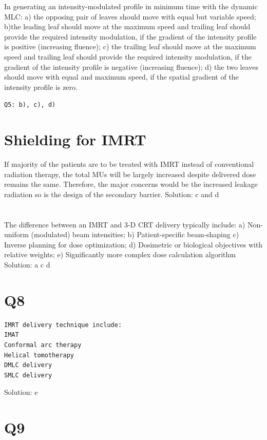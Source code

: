 \documentclass[]{book}
\theoremstyle{definition}
\theoremstyle{definition}
\theoremstyle{definition}
\theoremstyle{remark}
\begin{document}
In generating an intensity-modulated profile in minimum time with the
dynamic MLC: a) the opposing pair of leaves should move with equal but
variable speed; b)the leading leaf should move at the maximum speed and
trailing leaf should provide the required intensity modulation, if the
gradient of the intensity profile is positive (increasing fluence); c)
the trailing leaf should move at the maximum speed and trailing leaf
should provide the required intensity modulation, if the gradient of the
intensity profile is negative (increasing fluence); d) the two leaves
should move with equal and maximum speed, if the spatial gradient of the
intensity profile is zero.

\texttt{Q5:\ b),\ c),\ d)}

\section{Shielding for IMRT}\label{shielding-for-imrt}

If majority of the patients are to be treated with IMRT instead of
conventional radiation therapy, the total MUs will be largely increased
despite delivered dose remains the same. Therefore, the major concerns
would be the increased leakage radiation so is the design of the
secondary barrier. Solution: c and d

\section{}\label{section}

The difference between an IMRT and 3-D CRT delivery typically include:
a) Non-uniform (modulated) beam intensities; b) Patient-specific
beam-shaping c) Inverse planning for dose optimization; d) Dosimetric or
biological objectives with relative weights; e) Significantly more
complex dose calculation algorithm Solution: a c d

\section{Q8}\label{q8}

\begin{verbatim}
IMRT delivery technique include:
IMAT
Conformal arc therapy
Helical tomotherapy
DMLC delivery
SMLC delivery
\end{verbatim}

Solution: e

\section{Q9}\label{q9}
\end{document}
